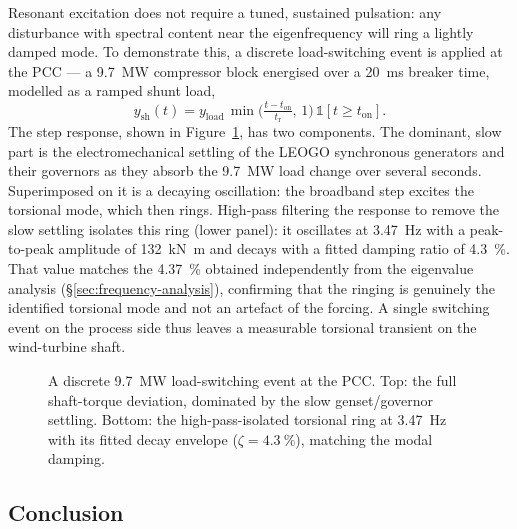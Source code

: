 Resonant excitation does not require a tuned, sustained pulsation: any
disturbance with spectral content near the eigenfrequency will ring a lightly
damped mode. To demonstrate this, a discrete load-switching event is applied at
the PCC --- a \SI{9.7}{\mega\watt} compressor block energised over a
\SI{20}{\milli\second} breaker time, modelled as a ramped shunt load,
\begin{equation}
  y_{\mathrm{sh}}(t) = y_{\mathrm{load}}\,
  \min\!\Big(\tfrac{t-t_{\mathrm{on}}}{t_{\mathrm{r}}},\,1\Big)\,
  \mathbb{1}[t \ge t_{\mathrm{on}}].
  \label{eq:ne-step}
\end{equation}
The step response, shown in Figure~\ref{fig:ne-step}, has two components. The
dominant, slow part is the electromechanical settling of the LEOGO synchronous
generators and their governors as they absorb the \SI{9.7}{\mega\watt} load
change over several seconds. Superimposed on it is a decaying oscillation: the
broadband step excites the torsional mode, which then rings. High-pass filtering
the response to remove the slow settling isolates this ring (lower panel): it
oscillates at \SI{3.47}{\hertz} with a peak-to-peak amplitude of
\SI{132}{\kilo\newton\metre} and decays with a fitted damping ratio of
\SI{4.3}{\percent}. That value matches the \SI{4.37}{\percent} obtained
independently from the eigenvalue analysis (\S\ref{sec:frequency-analysis}),
confirming that the ringing is genuinely the identified torsional mode and not
an artefact of the forcing. A single switching event on the process side thus
leaves a measurable torsional transient on the wind-turbine shaft.

\begin{figure}[t]
  \centering
  \caption{A discrete \SI{9.7}{\mega\watt} load-switching event at the PCC. Top:
  the full shaft-torque deviation, dominated by the slow genset/governor
  settling. Bottom: the high-pass-isolated torsional ring at \SI{3.47}{\hertz}
  with its fitted decay envelope ($\zeta=\SI{4.3}{\percent}$), matching the modal
  damping.}
  \label{fig:ne-step}
\end{figure}

\subsection{Conclusion}
\label{subsec:ne-conclusion}

